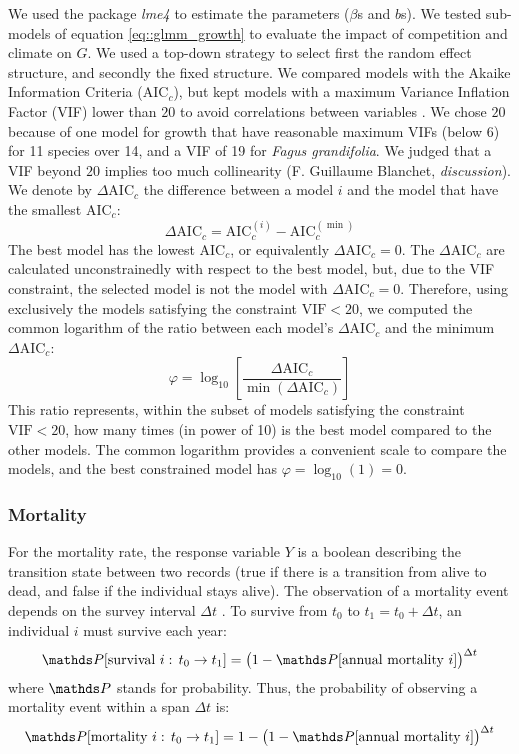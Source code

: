 We used the package \textit{lme4} \citep{lme4} to estimate the parameters ($ \beta $s and $ b $s). We tested sub-models of equation \eqref{eq::glmm_growth} to evaluate the impact of competition and climate on $ G $. We used a top-down strategy to select first the random effect structure, and secondly the fixed structure. We compared models with the Akaike Information Criteria ($ \text{AIC}_c $), but kept models with a maximum Variance Inflation Factor (VIF) lower than $ 20 $ to avoid correlations between variables \citep{Zuur2010}. We chose $ 20 $ because of one model for growth that have reasonable maximum VIFs (below 6) for 11 species over 14, and a VIF of 19 for \textit{Fagus grandifolia}. We judged that a VIF beyond $ 20 $ implies too much collinearity (F. Guillaume Blanchet, \textit{discussion}). We denote by $ \Delta \text{AIC}_c $ the difference between a model $ i $ and the model that have the smallest $ \text{AIC}_c $:
\[
	\Delta \text{AIC}_c = \text{AIC}_c^{(i)} - \text{AIC}_c^{(\min)}
\]
The best model has the lowest $ \text{AIC}_c $, or equivalently $ \Delta \text{AIC}_c = 0 $. The $ \Delta \text{AIC}_c $ are calculated unconstrainedly with respect to the best model, but, due to the VIF constraint, the selected model is not the model with $ \Delta \text{AIC}_c = 0 $. Therefore, using exclusively the models satisfying the constraint $ \text{VIF} < 20 $, we computed the common logarithm of the ratio between each model's $ \Delta \text{AIC}_c $ and the minimum $ \Delta \text{AIC}_c $:
\begin{equation} \label{eq::ratio}
	\varphi = \log_{10}\left[ \frac{\Delta \text{AIC}_c}{\min \left( \Delta \text{AIC}_c \right)} \right]
\end{equation}
This ratio represents, within the subset of models satisfying the constraint $ \text{VIF} < 20 $, how many times (in power of 10) is the best model compared to the other models. The common logarithm provides a convenient scale to compare the models, and the best constrained model has $ \varphi = \log_{10}(1) = 0 $.

\subsubsection{Mortality}
For the mortality rate, the response variable $ Y $ is a boolean describing the transition state between two records (true if there is a transition from alive to dead, and false if the individual stays alive). The observation of a mortality event depends on the survey interval $ \Delta t $ \citep{Lines2010}. To survive from $ t_0 $ to $ t_1 = t_0 + \Delta t $, an individual $ i $ must survive each year:
\[
	\Prob[\text{survival } i: \, t_0 \to t_1] = \big(1 - \Prob[\text{annual mortality } i]\big)^{\Delta t}
\]
where $ \Prob $ stands for probability. Thus, the probability of observing a mortality event within a span $ \Delta t $ is:
\[
	\Prob[\text{mortality } i: \, t_0 \to t_1] = 1 - \big(1 - \Prob[\text{annual mortality } i]\big)^{\Delta t}
\]

